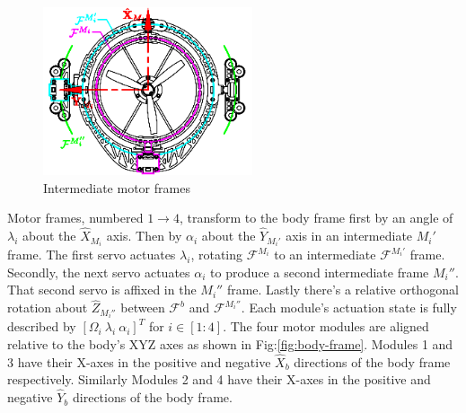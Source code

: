\begin{minipage}{\textwidth}
\begin{figure}
\centering
\includegraphics[width=0.55\textwidth]{figs/motor-frame}
\caption{Intermediate motor frames}
\label{fig:motor-frame}
\end{figure}
\par
Motor frames, numbered $1\rightarrow 4$, transform to the body frame first by an angle of $\lambda_i$ about the $\hat{X}_{M_i}$ axis. Then by $\alpha_i$ about the $\hat{Y}_{M_i'}$ axis in an intermediate $M_i'$ frame. The first servo actuates $\lambda_i$, rotating $\mathcal{F}^{M_i}$ to an intermediate $\mathcal{F}^{M_i'}$ frame. Secondly, the next servo actuates $\alpha_i$ to produce a second intermediate frame $M_i''$. That second servo is affixed in the $M_i''$ frame. Lastly there's a relative orthogonal rotation about $\hat{Z}_{M_i''}$ between $\mathcal{F}^b$ and $\mathcal{F}^{M_i''}$. Each module's actuation state is fully described by $[\Omega_{i}~\lambda_{i}~\alpha_{i}]^{T}$ for $i\in [1:4]$. The four motor modules are aligned relative to the body's XYZ axes as shown in Fig:\ref{fig:body-frame}. Modules 1 and 3 have their X-axes in the positive and negative $\hat{X}_b$ directions of the body frame respectively. Similarly Modules 2 and 4 have their X-axes in the positive and negative $\hat{Y}_b$ directions of the body frame.
\end{minipage}
\par
